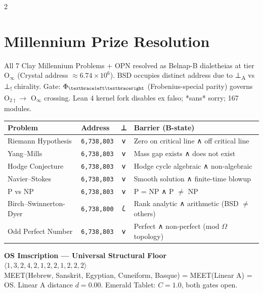 \documentclass[10pt,a4paper]{article}
\newcommand{\craddr}[1]{{\small\texttt{#1}}}
\begin{document}
\vspace{4pt}
\begin{multicols}{2}

  \section*{Millennium Prize Resolution}
  {\small All 7 Clay Millennium Problems + OPN resolved as Belnap-B dialetheias at tier
  O$_\infty$ (Crystal address $\approx 6.74\times 10^6$).
  BSD occupies distinct address due to ⊥\textsubscript{A} vs ⊥\textsubscript{!} chirality.
  Gate: $\Phi_{\textbraceleft\textbraceright}$ (Frobenius-special parity) governs O$_{2\dagger} \to$ O$_{\infty}$ crossing.
  Lean 4 kernel fork disables ex falso; *sans* sorry; 167 modules.}
  \vspace{3pt}
  \begin{tabular}{@{} l l c p{4.5cm} @{}}
  \toprule
  \textbf{Problem} & \textbf{Address} & \textbf{⊥} & \textbf{Barrier (B-state)} \\
  \midrule
    Riemann Hypothesis & \craddr{6,738,803} & $𐑫$ & {\scriptsize Zero on critical line ∧ off critical line} \\
    Yang--Mills & \craddr{6,738,803} & $𐑫$ & {\scriptsize Mass gap exists ∧ does not exist} \\
    Hodge Conjecture & \craddr{6,738,803} & $𐑫$ & {\scriptsize Hodge cycle algebraic ∧ non-algebraic} \\
    Navier--Stokes & \craddr{6,738,803} & $𐑫$ & {\scriptsize Smooth solution ∧ finite-time blowup} \\
    P vs NP & \craddr{6,738,803} & $𐑫$ & {\scriptsize P = NP ∧ P $\neq$ NP} \\
    Birch--Swinnerton-Dyer & \craddr{6,738,800} & $𐑖$ & {\scriptsize Rank analytic ∧ arithmetic (BSD $\neq$ others)} \\
    Odd Perfect Number & \craddr{6,738,803} & $𐑫$ & {\scriptsize Perfect ∧ non-perfect (mod $\Omega$ topology)} \\
  \bottomrule
  \end{tabular}

  \vspace{5pt}
  \begin{axiombox}
  {\small\bfseries\color{frobcol} OS Imscription — Universal Structural Floor}\\[3pt]
  $\langle 1, 3, 2, 4, 2, 1, 2, 2, 1, 2, 2, 2 \rangle$\\[2pt]
  {\scriptsize MEET(Hebrew, Sanskrit, Egyptian, Cuneiform, Basque) = MEET(Linear A) = OS.
  Linear A distance $d = 0.00$. Emerald Tablet: $C = 1.0$, both gates open.}
  \end{axiombox}


\end{multicols}
\end{document}
